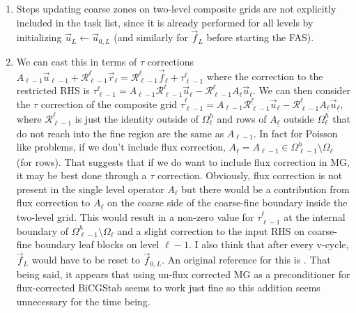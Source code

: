 \documentclass{article}
\begin{document}
\begin{enumerate}
    \item\label{step:implicit_u0} Steps updating coarse zones on two-level composite grids are not explicitly included in the task list, since it is already performed for all levels by initializing $\vec{u}_L \gets \vec{u}_{0,L}$ (and similarly for $\vec{f}_L$ before starting the FAS). 
    \item\label{step:rhs_residual_update} We can cast this in terms of $\tau$ corrections $A_{\ell - 1} \vec{u}_{\ell - 1} + \mathcal{R}^\ell_{\ell - 1} \vec{r}_\ell = \mathcal{R}^\ell_{\ell - 1} \vec{f}_\ell + \tau^\ell_{\ell - 1}$ where the correction to the restricted RHS is $\tau^\ell_{\ell - 1} = A_{\ell - 1} \mathcal{R}^\ell_{\ell - 1}  \vec{u}_\ell -  \mathcal{R}^\ell_{\ell - 1} A_\ell \vec{u}_\ell$. We can then consider the $\tau$ correction of the composite grid $\tau^{\underline{\ell}}_{\ell - 1} = A_{\ell - 1} \mathcal{R}^{\underline{\ell}}_{\ell - 1}  \vec{u}_{\underline{\ell}} -  \mathcal{R}^{\underline{\ell}}_{\ell - 1} A_{\underline{\ell}} \vec{u}_{\underline{\ell}}$, where $\mathcal{R}^{\underline{\ell}}_{\ell - 1}$ is just the identity outside of $\Omega^h_\ell$ and rows of $A_{\underline{\ell}}$ outside $\Omega^h_\ell$ that do not reach into the fine region are the same as $A_{\ell-1}$. In fact for Poisson like problems, if we don't include flux correction, $A_{\underline{\ell}} = A_{\ell - 1} \in \Omega^h_{\ell - 1} \setminus \Omega_{\ell}$ (for rows). That suggests that if we do want to include flux correction in MG, it may be best done through a $\tau$ correction. Obviously, flux correction is not present in the single level operator $A_\ell$ but there would be a contribution from flux correction to $A_{\underline{\ell}}$ on the coarse side of the coarse-fine boundary inside the two-level grid. This would result in a non-zero value for $\tau^{\underline{\ell}}_{\ell - 1}$ at the internal boundary of $\Omega^h_{\ell-1} \setminus \Omega_{\ell}$ and a slight correction to the input RHS on coarse-fine boundary leaf blocks on level $\ell - 1$. I also think that after every v-cycle, $\vec{f}_L$ would have to be reset to $\vec{f}_{0,L}$. An original reference for this is \cite{Bai:1987}. That being said, it appears that using un-flux corrected MG as a preconditioner for flux-corrected BiCGStab seems to work just fine so this addition seems unnecessary for the time being.
\end{enumerate}
\end{document}
